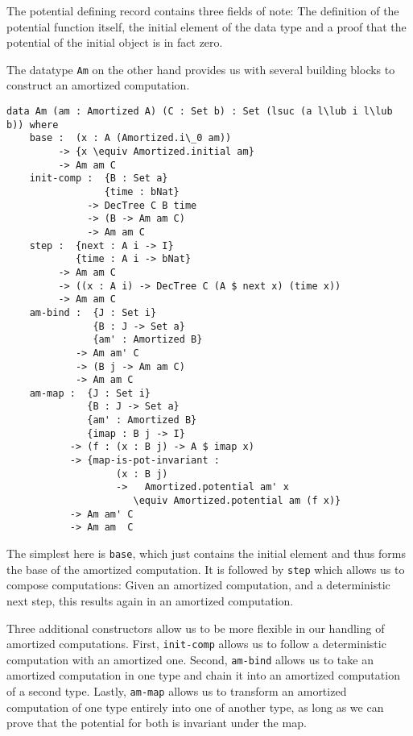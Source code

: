 The potential defining record contains three fields of note: The definition of the potential function itself, the initial element of the data type and a proof that the potential of the initial object is in fact zero.

The datatype \texttt{Am} on the other hand provides us with several building blocks to construct an amortized computation.

\begin{lstlisting}[caption={Building blocks of an amortized computation},label={lst:amortized:framework:computation},emph={Am,Amortized,base,init,comp,step,bind,map,initial,DecTree}]
data Am (am : Amortized A) (C : Set b) : Set (lsuc (a l\lub i l\lub b)) where
    base :  (x : A (Amortized.i\_0 am))
         -> {x \equiv Amortized.initial am}
         -> Am am C
    init-comp :  {B : Set a}
                 {time : bNat}
              -> DecTree C B time
              -> (B -> Am am C)
              -> Am am C
    step :  {next : A i -> I}
            {time : A i -> bNat}
         -> Am am C
         -> ((x : A i) -> DecTree C (A $ next x) (time x))
         -> Am am C
    am-bind :  {J : Set i}
               {B : J -> Set a}
               {am' : Amortized B}
            -> Am am' C
            -> (B j -> Am am C)
            -> Am am C
    am-map :  {J : Set i}
              {B : J -> Set a}
              {am' : Amortized B}
              {imap : B j -> I}
           -> (f : (x : B j) -> A $ imap x)
           -> {map-is-pot-invariant :
                   (x : B j)
                   ->   Amortized.potential am' x
                      \equiv Amortized.potential am (f x)}
           -> Am am' C
           -> Am am  C
\end{lstlisting}

The simplest here is \texttt{base}, which just contains the initial element and thus forms the base of the amortized computation. It is followed by \texttt{step} which allows us to compose computations: Given an amortized computation, and a deterministic next step, this results again in an amortized computation.

Three additional constructors allow us to be more flexible in our handling of amortized computations. First, \texttt{init-comp} allows us to follow a deterministic computation with an amortized one. Second, \texttt{am-bind} allows us to take an amortized computation in one type and chain it into an amortized computation of a second type. Lastly, \texttt{am-map} allows us to transform an amortized computation of one type entirely into one of another type, as long as we can prove that the potential for both is invariant under the map.


